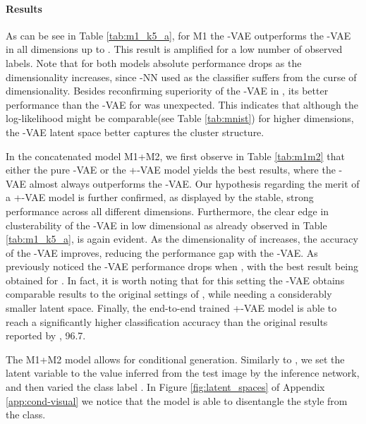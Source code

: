 \documentclass[letterpaper]{article}
\newcommand{\Sv}{}
\newcommand{\Nv}{}
\begin{document}
\paragraph{Results}

As can be see in Table \ref{tab:m1_k5_a}, for M1 the \Sv-VAE outperforms the \Nv-VAE in all dimensions up to . This result is amplified for a low number of observed labels. Note that for both models absolute performance drops as the dimensionality increases, since -NN used as the classifier suffers from the curse of dimensionality. Besides reconfirming superiority of the \Sv-VAE in , its better performance than the \Nv-VAE for  was unexpected. This indicates that although the log-likelihood might be comparable(see Table \ref{tab:mnist}) for higher dimensions, the \Sv-VAE latent space better captures the cluster structure.

In the concatenated model M1+M2, we first observe in Table \ref{tab:m1m2} that either the pure \Sv-VAE or the \Sv+\Nv-VAE model yields the best results, where the \Sv-VAE almost always outperforms the \Nv-VAE. Our hypothesis regarding the merit of a \Sv+\Nv-VAE model is further confirmed, as displayed by the stable, strong performance across all different dimensions. Furthermore, the clear edge in clusterability of the \Sv-VAE in low dimensional  as already observed in Table \ref{tab:m1_k5_a}, is again evident. As the dimensionality of  increases, the accuracy of the \Nv-VAE improves, reducing the performance gap with the \Sv-VAE. As previously noticed the \Sv-VAE performance drops when , with the best result being obtained for . In fact, it is worth noting that for this setting the \Sv-VAE obtains comparable results to the original settings of \citep{kingma-semi-super}, while needing a considerably smaller latent space. Finally, the end-to-end trained \Sv+\Nv-VAE model is able to reach a significantly higher classification accuracy than the original results reported by \citet{kingma-semi-super}, 96.7{\tiny}.

The M1+M2 model allows for conditional generation. Similarly to \citep{kingma-semi-super}, we set the latent variable  to the value inferred from the test image by the inference network, and then varied the class label . In Figure \ref{fig:latent_spaces} of Appendix \ref{app:cond-visual} we notice that the model is able to disentangle the style from the class.
\end{document}
